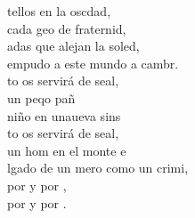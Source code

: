 \documentclass[12pt]{article}
\begin{document}
\begin{multicols*}{2}
\begin{cancion}
	tellos en la oscdad,\\
	cada geo de fraternid,\\
	adas que alejan la soled,\\
	empudo a este mundo a cambr.\\
	to os servirá de seal, \\
	un peqo pañ  \\
	niño en unaueva sins\\
	to os servirá de seal, \\
	un hom en el monte e \\
	lgado de un mero como un crimi,\\
	por  y por , \\
	por  y por .  \\
\end{cancion}%


\end{multicols*}
\end{document}
